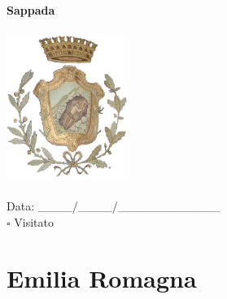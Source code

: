 \documentclass[a5paper,12pt]{article}
\begin{document}
\hfill
\vspace{0.7cm}
\noindent
\begin{minipage}[t]{0.45\textwidth}
    \begin{center}
        \textbf{Sappada}
    \end{center}
    \vspace{-0.5cm} %
    \begin{center}
        \includegraphics[height= 5cm, width=4cm]{Friuli Venezia Giulia/Sappada-Stemma.png}
    \end{center}
    \vspace{-0.4cm} %
    \begin{flushleft}
        Data: \_\_\_\_/\_\_\_\_/\_\_\_\_\_\_\_\_\_\_\_\_ \\
        $\square$ Visitato
    \end{flushleft}
\end{minipage}

\newpage

\section*{Emilia Romagna}

\newpage
\end{document}

